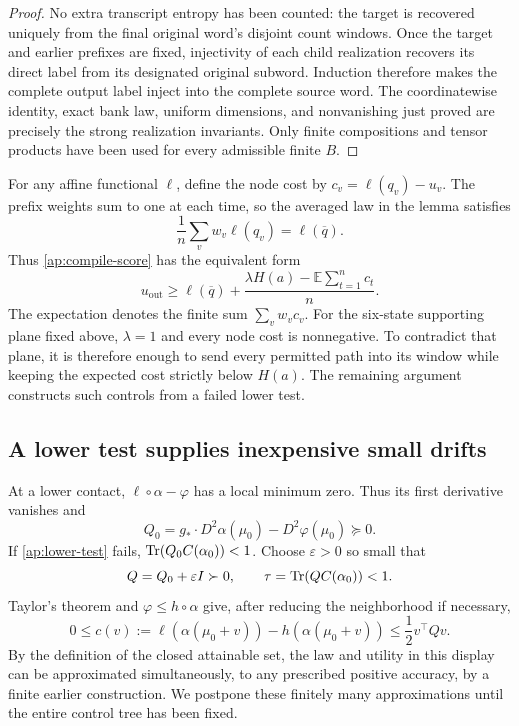 \begin{proof}
No extra transcript entropy has been counted: the target is recovered
uniquely from the final original word's disjoint count windows.  Once
the target and earlier prefixes are fixed, injectivity of each child
realization recovers its direct label from its designated original subword.
Induction therefore makes the complete output label inject into the
complete source word.  The coordinatewise identity, exact bank law,
uniform dimensions, and nonvanishing just proved are precisely the strong
realization invariants.  Only finite compositions and tensor products have
been used for every admissible finite \(B\).
\end{proof}

For any affine functional \(\ell\), define the node cost by
\(c_v=\ell(q_v)-u_v\).  The prefix weights sum to one at each time,
so the averaged law in the lemma satisfies
\[
 \frac1n\sum_v w_v\ell(q_v)=\ell(\overline q).
\]
Thus \eqref{ap:compile-score} has the equivalent form
\begin{equation}\label{ap:compile-gain}
 u_{\mathrm{out}}
 \geq\ell(\overline q)
       +\frac{\lambda H(a)-\mathbb E\sum_{t=1}^n c_t}{n}.
\end{equation}
The expectation denotes the finite sum \(\sum_v w_vc_v\).
For the six-state supporting plane fixed above, \(\lambda=1\) and
every node cost is nonnegative.  To contradict that plane, it is therefore
enough to send every permitted path into its window while keeping the
expected cost strictly below \(H(a)\).  The remaining argument constructs
such controls from a failed lower test.

\subsection{A lower test supplies inexpensive small drifts}
\label{ap:local-cost}

At a lower contact, \(\ell\circ\alpha-\varphi\) has a local minimum
zero.  Thus its first derivative vanishes and
\begin{equation}\label{ap:q0}
 Q_0=g_*\cdot D^2\alpha(\mu_0)-D^2\varphi(\mu_0)\succeq0.
\end{equation}
If \eqref{ap:lower-test} fails, \(\operatorname{Tr}(Q_0C(\alpha_0))<1\).
Choose \(\varepsilon>0\) so small that
\begin{equation}\label{ap:tau}
 Q=Q_0+\varepsilon I\succ0,
 \qquad \tau=\operatorname{Tr}(QC(\alpha_0))<1.
\end{equation}
Taylor's theorem and \(\varphi\leq h\circ\alpha\) give, after reducing
the neighborhood if necessary,
\begin{equation}\label{ap:local-cost-bound}
 0\leq c(v):=\ell(\alpha(\mu_0+v))-h(\alpha(\mu_0+v))
 \leq \frac12v^\top Qv.
\end{equation}
By the definition of the closed attainable set, the law and utility in
this display can be approximated simultaneously, to any prescribed positive
accuracy, by a finite earlier construction.  We postpone these finitely
many approximations until the entire control tree has been fixed.

